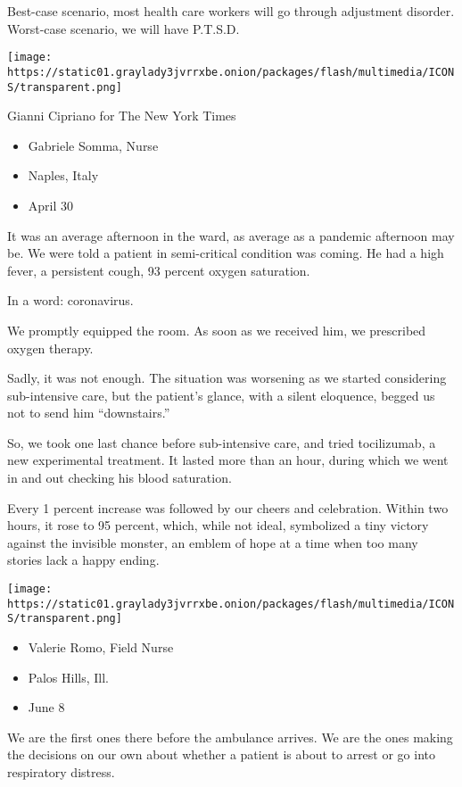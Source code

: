 Best-case scenario, most health care workers will go through adjustment
disorder. Worst-case scenario, we will have P.T.S.D.

\texttt{[image: https://static01.graylady3jvrrxbe.onion/packages/flash/multimedia/ICONS/transparent.png]}

Gianni Cipriano for The New York Times

\begin{itemize}
\tightlist
\item
  Gabriele Somma, Nurse
\item
  Naples, Italy
\item
  April 30
\end{itemize}

It was an average afternoon in the ward, as average as a pandemic
afternoon may be. We were told a patient in semi-critical condition was
coming. He had a high fever, a persistent cough, 93 percent oxygen
saturation.

In a word: coronavirus.

We promptly equipped the room. As soon as we received him, we prescribed
oxygen therapy.

Sadly, it was not enough. The situation was worsening as we started
considering sub-intensive care, but the patient's glance, with a silent
eloquence, begged us not to send him ``downstairs.''

So, we took one last chance before sub-intensive care, and tried
tocilizumab, a new experimental treatment. It lasted more than an hour,
during which we went in and out checking his blood saturation.

Every 1 percent increase was followed by our cheers and celebration.
Within two hours, it rose to 95 percent, which, while not ideal,
symbolized a tiny victory against the invisible monster, an emblem of
hope at a time when too many stories lack a happy ending.

\texttt{[image: https://static01.graylady3jvrrxbe.onion/packages/flash/multimedia/ICONS/transparent.png]}

\begin{itemize}
\tightlist
\item
  Valerie Romo, Field Nurse
\item
  Palos Hills, Ill.
\item
  June 8
\end{itemize}

We are the first ones there before the ambulance arrives. We are the
ones making the decisions on our own about whether a patient is about to
arrest or go into respiratory distress.

